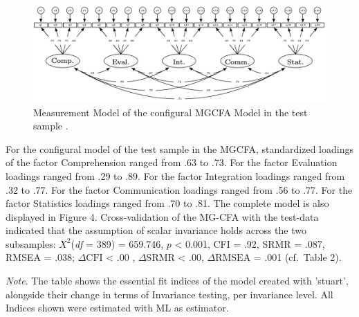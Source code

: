 \documentclass[
  12pt,
  a4paper,
  twoside]{article}
\begin{document}
\begin{figure}

{\centering \includegraphics[width=\textwidth]{images/Model6} 

}

\caption{Measurement Model of the configural MGCFA Model in the test sample .}\label{fig:figure4}
\end{figure}

For the configural model of the test sample in the MGCFA, standardized loadings of the factor Comprehension ranged from .63 to .73. For the factor Evaluation loadings ranged from .29 to .89. For the factor Integration loadings ranged from .32 to .77. For the factor Communication loadings ranged from .56 to .77. For the factor Statistics loadings ranged from .70 to .81. The complete model is also displayed in Figure 4.
Cross-validation of the MG-CFA with the test-data indicated that the assumption of scalar invariance holds across the two subsamples: \(X^{2}\)(\emph{df} = 389) = 659.746, \(p\) \textless{} 0.001, CFI = .92, SRMR = .087, RMSEA = .038; \(\Delta\text{CFI}\) \textless{} .00 , \(\Delta\text{SRMR}\) \textless{} .00, \(\Delta\text{RMSEA}\) = .001 (cf.~Table 2).

\begin{table}[htpb]
\caption{Fit Indices for Model and Results of MG-CFA testing}

\vspace{10pt}
\small\textit{Note}. The table shows the essential fit indices of the model created with 'stuart', alongside their change in terms of Invariance testing, per invariance level. All Indices shown were estimated with ML as estimator.
\end{table}
\end{document}
